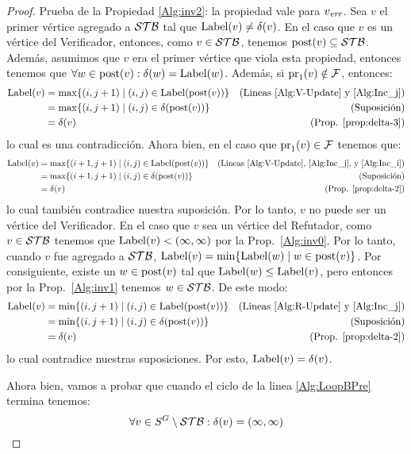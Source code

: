 \begin{proof}
	Prueba de la Propiedad \ref{Alg:inv2}: la propiedad vale para $v_{\mathit{err}}$. Sea $v$ el primer vértice agregado a $\mathcal{STB}$ tal que $\operatorname{Label}(v) \neq \delta(v)$. En el caso que $v$ es un vértice del Verificador, entonces, 
	como $v \in \mathcal{STB}$, tenemos $\operatorname{post}(v) \subseteq \mathcal{STB}$. Además, asumimos que $v$ era el primer vértice que viola esta propiedad,  
	entonces tenemos que $\forall w \in \operatorname{post}(v):\delta(w)=\operatorname{Label}(w)$. Además, si $\operatorname{pr}_{1}(v) \notin \mathcal{F}$, entonces: 
\begin{align*}
\operatorname{Label}(v) & = \max \{(i,j+1) \mid (i,j) \in \operatorname{Label}(\operatorname{post}(v))\}&  \text{(Lineas \ref{Alg:V-Update} y \ref{Alg:Inc_j})}\\
	      & =  \max \{(i,j+1) \mid (i,j) \in \delta(\operatorname{post}(v))\}&  \text{(Suposición)}\\
	      & = \delta(v)& \text{(Prop. \ref{prop:delta-3})}
\end{align*}
lo cual es una contradicción. Ahora bien, en el caso que $\operatorname{pr}_{1}(v) \in \mathcal{F}$ tenemos que:
\begin{align*}
\operatorname{Label}(v) & = \max \{(i+1,j+1) \mid (i,j) \in \operatorname{Label}(\operatorname{post}(v))\}&  \text{(Lineas \ref{Alg:V-Update}, \ref{Alg:Inc_j}, y \ref{Alg:Inc_i})}\\
	      & =  \max \{(i+1,j+1) \mid (i,j) \in \delta(\operatorname{post}(v))\}&  \text{(Suposición)}\\
	      & = \delta(v)& \text{(Prop. \ref{prop:delta-2})}
\end{align*}
lo cual también contradice nuestra suposición. Por lo tanto, $v$ no puede ser un vértice del Verificador. 
En el caso que $v$ sea un vértice del Refutador, como $v \in \mathcal{STB}$ tenemos que $\operatorname{Label}(v) < (\infty, \infty)$ por la Prop.~\ref{Alg:inv0}. 
Por lo tanto, cuando $v$ fue agregado a $\mathcal{STB}$, $\operatorname{Label}(v) = \min\{ \operatorname{Label}(w) \mid w \in \operatorname{post}(v)\}$. Por consiguiente, 
existe un $w \in \operatorname{post}(v)$ tal que $\operatorname{Label}(w) \leq \operatorname{Label}(v)$, pero entonces por la Prop.~\ref{Alg:inv1} 
tenemos $w \in \mathcal{STB}$. De este modo:
\begin{align*}
\operatorname{Label}(v) & = \min \{(i,j+1) \mid (i,j) \in \operatorname{Label}(\operatorname{post}(v))\}&  \text{(Lineas \ref{Alg:R-Update} y \ref{Alg:Inc_j})} \\
	      & =  \min \{(i,j+1) \mid (i,j) \in \delta(\operatorname{post}(v))\}&  \text{(Suposición)}\\
	      & = \delta(v)& \text{(Prop. \ref{prop:delta-2})}
\end{align*}
lo cual contradice nuestras suposiciones. Por esto, $\operatorname{Label}(v) = \delta(v)$.

	Ahora bien, vamos a probar que cuando el ciclo de la linea \ref{Alg:LoopBPre} termina tenemos:
\begin{equation}\label{Alg:inv3}
 \forall v \in S^G \setminus \mathcal{STB} : \delta(v)=(\infty, \infty)
\end{equation}


\end{proof}
